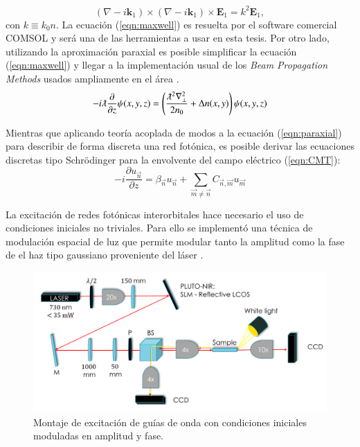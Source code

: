 \documentclass{article}
\begin{document}
\begin{equation}
	(\nabla-i\textbf{k}_1)\times(\nabla-i\textbf{k}_1)\times \textbf{E}_1 = k^2 \textbf{E}_1,
	 \label{eqn:maxwell}
\end{equation}
con $k \equiv k_0 n$.
La ecuación (\ref{eqn:maxwell}) es resuelta por el software comercial COMSOL y será una de las herramientas a usar en esta tesis. Por otro lado, utilizando la aproximación paraxial es posible simplificar la ecuación (\ref{eqn:maxwell}) y llegar a la implementación usual de los \textit{Beam Propagation Methods} usados ampliamente en el área \cite{bpm}.
\begin{equation}
	-i\lambdabar\frac{\partial}{\partial z}\psi(x,y,z) = \left(\frac{\lambdabar^2\nabla_\perp^2}{2n_0} + \Delta n(x,y)\right) \psi (x,y,z) \label{eqn:paraxial}
\end{equation}

Mientras que aplicando teoría acoplada de modos a la ecuación (\ref{eqn:paraxial}) para describir de forma discreta una red fotónica, es posible derivar las ecuaciones discretas tipo Schrödinger para la envolvente del campo eléctrico (\ref{eqn:CMT}):
\begin{equation}
	-i\frac{\partial u_{\vec{n}} }{\partial z} = \beta_{\vec{n}}u_{\vec{n}} + \sum_{\vec{m}\neq\vec{n}} C_{\vec{n},\vec{m}}u_{\vec{m}} \label{eqn:CMT}
\end{equation}

La excitación de redes fotónicas interorbitales hace necesario el uso de condiciones iniciales no triviales. Para ello se implementó una técnica de modulación espacial de luz que permite modular tanto la amplitud como la fase de el haz tipo gaussiano proveniente del láser \cite{slm}.

\begin{figure}[H]
	\centering
	\includegraphics[width=0.9\linewidth]{./media/montaje.png}
	\caption{Montaje de excitación de guías de onda con condiciones iniciales moduladas en amplitud y fase.\label{fig:SLM}}
\end{figure}
\end{document}
